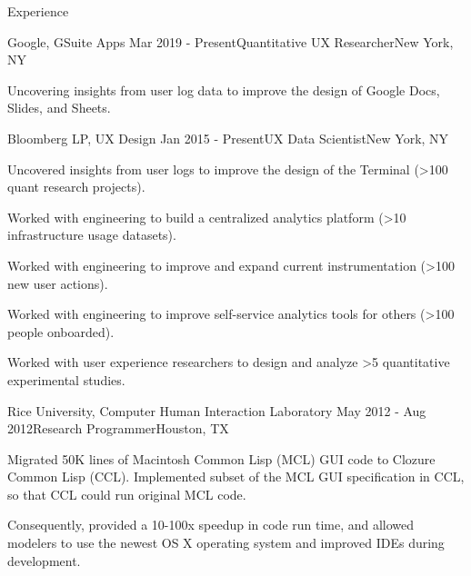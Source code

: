 
\begin{rSection}{Experience}

  \begin{rSubsection}{Google, GSuite Apps}
    {Mar 2019 - Present}{Quantitative UX Researcher}{New York, NY}
  \item Uncovering insights from user log data to improve the design of Google Docs, Slides, and Sheets.
  \end{rSubsection}

  \begin{rSubsection}{Bloomberg LP, UX Design}
    {Jan 2015 - Present}{UX Data Scientist}{New York, NY}
    \item Uncovered insights from user logs to improve the design of the Terminal (\textgreater100 quant research projects).
    \item Worked with engineering to build a centralized analytics platform (\textgreater10 infrastructure usage datasets).
    \item Worked with engineering to improve and expand current instrumentation (\textgreater100 new user actions).
    \item Worked with engineering to improve self-service analytics tools for others (\textgreater100 people onboarded). 
    \item Worked with user experience researchers to design and analyze \textgreater5 quantitative experimental studies.
  \end{rSubsection}

  \begin{rSubsection}{Rice University, Computer Human Interaction Laboratory}
    {May 2012 - Aug 2012}{Research Programmer}{Houston, TX}
  \item Migrated 50K lines of Macintosh Common Lisp (MCL) GUI code to Clozure Common Lisp (CCL).
    Implemented subset of the MCL GUI specification in CCL, so that CCL could run original MCL code.
  \item Consequently, provided a 10-100x speedup in code run time, and allowed modelers to use the newest OS X operating system and improved IDEs during development.
  \end{rSubsection}


\end{rSection}

